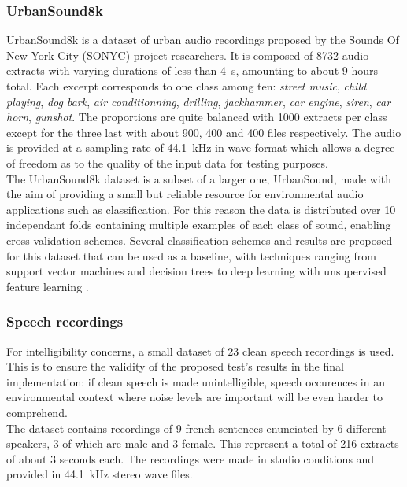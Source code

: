 \documentclass[12pt,times,onecolumn]{article}
\begin{document}
\subsubsection{UrbanSound8k}
UrbanSound8k \cite{salamon2014} is a dataset of urban audio recordings proposed by the Sounds Of New-York City (SONYC) project researchers. It is composed of 8732 audio extracts with varying durations of less than 4~s, amounting to about 9 hours total. Each excerpt corresponds to one class among ten: \textit{street music}, \textit{child playing}, \textit{dog bark}, \textit{air conditionning}, \textit{drilling}, \textit{jackhammer}, \textit{car engine}, \textit{siren}, \textit{car horn}, \textit{gunshot}. The proportions are quite balanced with 1000 extracts per class except for the three last with about 900, 400 and 400 files respectively. The audio is provided at a sampling rate of 44.1~kHz in wave format which allows a degree of freedom as to the quality of the input data for testing purposes.\\

The UrbanSound8k dataset is a subset of a larger one, UrbanSound, made with the aim of providing a small but reliable resource for environmental audio applications such as classification. For this reason the data is distributed over 10 independant folds containing multiple examples of each class of sound, enabling cross-validation schemes. Several classification schemes and results are proposed for this dataset that can be used as a baseline, with techniques ranging from support vector machines and decision trees \cite{salamon2014} to deep learning \cite{salamon2017} with unsupervised feature learning \cite{salamon2015-2}.

\subsubsection{Speech recordings}
For intelligibility concerns, a small dataset of 23 clean speech recordings is used. This is to ensure the validity of the proposed test's results in the final implementation: if clean speech is made unintelligible, speech occurences in an environmental context where noise levels are important will be even harder to comprehend.\\

The dataset contains recordings of 9 french sentences enunciated by 6 different speakers, 3 of which are male and 3 female. This represent a total of 216 extracts of about 3 seconds each. The recordings were made in studio conditions and provided in 44.1~kHz stereo wave files.
\end{document}
